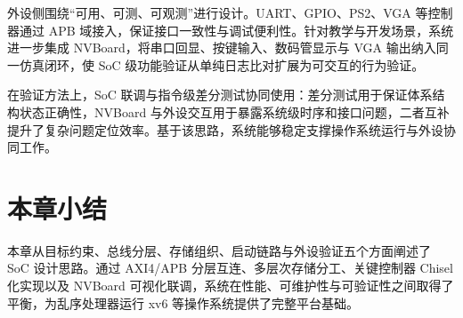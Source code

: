 外设侧围绕“可用、可测、可观测”进行设计。UART、GPIO、PS2、VGA 等控制器通过 APB 域接入，保证接口一致性与调试便利性。针对教学与开发场景，系统进一步集成 NVBoard，将串口回显、按键输入、数码管显示与 VGA 输出纳入同一仿真闭环，使 SoC 级功能验证从单纯日志比对扩展为可交互的行为验证。

在验证方法上，SoC 联调与指令级差分测试协同使用：差分测试用于保证体系结构状态正确性，NVBoard 与外设交互用于暴露系统级时序和接口问题，二者互补提升了复杂问题定位效率。基于该思路，系统能够稳定支撑操作系统运行与外设协同工作。

\section{本章小结}

本章从目标约束、总线分层、存储组织、启动链路与外设验证五个方面阐述了 SoC 设计思路。通过 AXI4/APB 分层互连、多层次存储分工、关键控制器 Chisel 化实现以及 NVBoard 可视化联调，系统在性能、可维护性与可验证性之间取得了平衡，为乱序处理器运行 xv6 等操作系统提供了完整平台基础。
